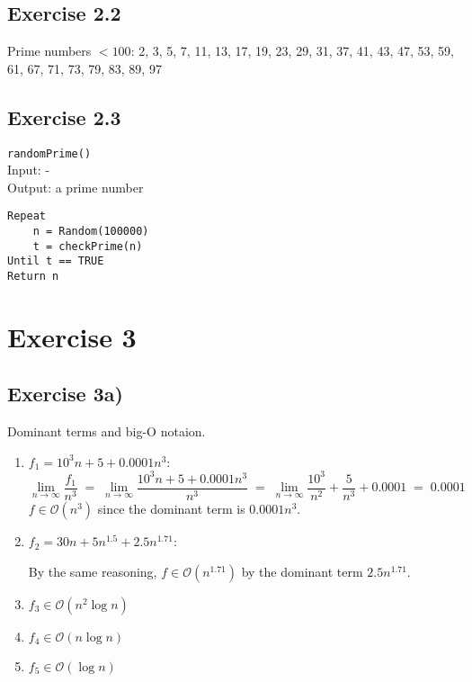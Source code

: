 \documentclass[a4paper]{scrreprt}
\begin{document}
\subsection*{Exercise 2.2}

Prime numbers $< 100$: 2, 3, 5, 7, 11, 13, 17, 19, 23, 29, 31, 37, 41, 43, 47, 53, 59, 61, 67,
71, 73, 79, 83, 89, 97

\subsection*{Exercise 2.3}

\texttt{randomPrime()}\\
Input: -\\
Output: a prime number

\begin{lstlisting}
Repeat
    n = Random(100000)
    t = checkPrime(n)
Until t == TRUE
Return n
\end{lstlisting}


\section*{Exercise 3}

\subsection*{Exercise 3a)}

Dominant terms and big-O notaion.

\begin{enumerate}
    \item \(f_1=10^3n+5+0.0001n^3\):
        \[\lim_{n\rightarrow\infty}\frac{f_1}{n^3}\;=\;\lim_{n\rightarrow\infty}\frac{10^3n+5+0.0001n^3}{n^3}
        \;=\;\lim_{n\rightarrow\infty}\frac{10^3}{n^2}+\frac 5{n^3}+0.0001\;=\;0.0001\]
        $f\in\mathcal O(n^3)$ since the dominant term is $0.0001n^3$.

    \item \(f_2=30n+5n^{1.5}+2.5n^{1.71}\):

        By the same reasoning, $f\in\mathcal O(n^{1.71})$ by the dominant term $2.5n^{1.71}$.

    \item  \(f_3\in\mathcal O(n^2\log n)\)
    \item  \(f_4\in\mathcal O(n\log n)\)
    \item  \(f_5\in\mathcal O(\log n)\)
\end{enumerate}
\end{document}
